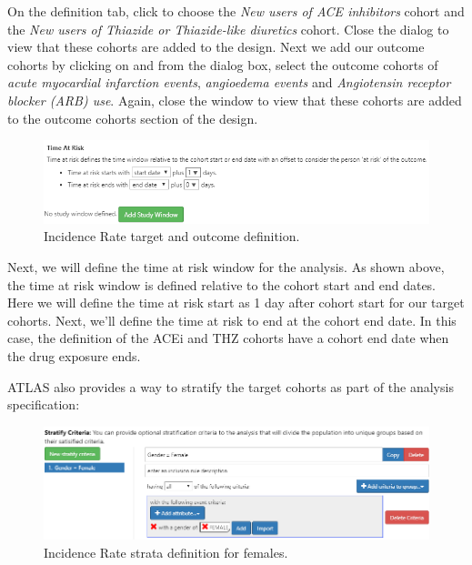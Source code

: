 \documentclass[11pt]{book}
\theoremstyle{definition}
\theoremstyle{definition}
\theoremstyle{definition}
\theoremstyle{remark}
\begin{document}
On the definition tab, click to choose the \emph{New users of ACE inhibitors} cohort and the \emph{New users of Thiazide or Thiazide-like diuretics} cohort. Close the dialog to view that these cohorts are added to the design. Next we add our outcome cohorts by clicking on and from the dialog box, select the outcome cohorts of \emph{acute myocardial infarction events}, \emph{angioedema events} and \emph{Angiotensin receptor blocker (ARB) use}. Again, close the window to view that these cohorts are added to the outcome cohorts section of the design.

\begin{figure}

{\centering \includegraphics[width=1\linewidth]{images/Characterization/atlasIncidenceTimeAtRisk} 

}

\caption{Incidence Rate target and outcome definition.}\label{fig:atlasIncidenceTimeAtRisk}
\end{figure}

Next, we will define the time at risk window for the analysis. As shown above, the time at risk window is defined relative to the cohort start and end dates. Here we will define the time at risk start as 1 day after cohort start for our target cohorts. Next, we'll define the time at risk to end at the cohort end date. In this case, the definition of the ACEi and THZ cohorts have a cohort end date when the drug exposure ends.

ATLAS also provides a way to stratify the target cohorts as part of the analysis specification:

\begin{figure}

{\centering \includegraphics[width=1\linewidth]{images/Characterization/atlasIncidenceStratifyFemale} 

}

\caption{Incidence Rate strata definition for females.}\label{fig:atlasIncidenceStratifyFemale}
\end{figure}
\end{document}
